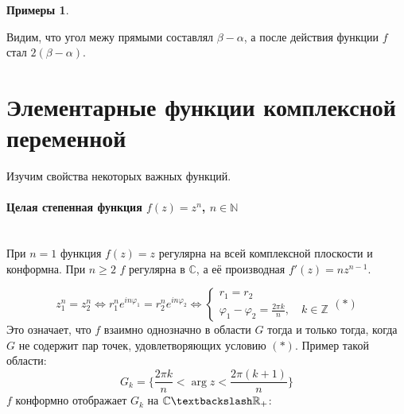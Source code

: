 \documentclass[11pt,openany,a4paper]{scrartcl}
\theoremstyle{plain}
\theoremstyle{definition}
\newtheorem{examples}[theorem]{Примеры}
\newcommand\mb{\mathbb}
\newcommand\real{\mb R}
\newcommand{\complex}{\mb C}
\newcommand\lparagraph[1]{\paragraph{#1}\mbox{}\\}
\begin{document}
\begin{examples}
\begin{itemize}
\begin{center}
	\end{center}
	Видим, что угол межу прямыми составлял $\beta - \alpha$, а после действия функции $f$ стал $2(\beta - \alpha)$.
\end{itemize}	
\end{examples}

\section{Элементарные функции комплексной переменной}

Изучим свойства некоторых важных функций.

\lparagraph{Целая степенная функция $f(z) = z^n$, $n \in \mb N$}

При $n = 1$ функция $f(z) = z$ регулярна на всей комплексной плоскости и конформна. При $n \geqslant 2$ $f$ регулярна
в $\complex$, а её производная $f'(z) = nz^{n-1}$.

$$
z_1^n = z_2^n \iff r_1^ne^{in\varphi_1} = r_2^ne^{in\varphi_2} \iff
\begin{cases}
	r_1 = r_2\\
	\varphi_1 - \varphi_2 = \frac{2\pi k}{n},\quad k \in \mb Z
\end{cases}
(\ast)
$$
Это означает, что $f$ взаимно однозначно в области $G$ тогда и только тогда, когда $G$ не содержит пар точек, 
удовлетворяющих условию $(\ast)$. Пример такой области:
$$
G_k = \bigg\{\frac{2\pi k}{n} < \arg z < \frac{2\pi(k + 1)}{n}\bigg\}
$$
$f$ конформно отображает $G_k$ на $\complex \textbackslash \real_+$:
\end{document}
